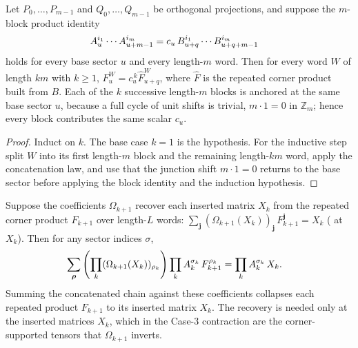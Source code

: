 \begin{lemma}
    \label{lem:periodic_corner_product_blockmatch_pow}
    \leanok
    Let $P_0,\ldots,P_{m-1}$ and $Q_0,\ldots,Q_{m-1}$ be orthogonal projections,
    and suppose the $m$-block product identity
    \begin{align}
        A_u^{i_1}\cdots A_{u+m-1}^{i_m}
         & =
        c_u\, B_{u+q}^{i_1}\cdots B_{u+q+m-1}^{i_m}
        \notag
    \end{align}
    holds for every base sector $u$ and every length-$m$ word. Then for every
    word $W$ of length $km$ with $k\ge1$,
    $F_u^{W}=c_u^{\,k} \widehat F_{u+q}^{W}$, where $\widehat F$ is the
    repeated corner product built from $B$. Each of the $k$ successive
    length-$m$ blocks is anchored at the same base sector $u$, because a full
    cycle of unit shifts is trivial, $m\cdot 1=0$ in $\mathbb Z_m$; hence every
    block contributes the same scalar $c_u$.
\end{lemma}

\begin{proof}\leanok
    Induct on $k$. The base case $k=1$ is the hypothesis. For the inductive
    step split $W$ into its first length-$m$ block and the remaining length-$km$
    word, apply the concatenation law, and use that the junction shift
    $m\cdot 1=0$ returns to the base sector before applying the block identity
    and the induction hypothesis.
\end{proof}

\begin{lemma}
    \label{lem:periodic_corner_contraction}
    \leanok
    Suppose the coefficients $\Omega_{k+1}$ recover each inserted matrix $X_k$
    from the repeated corner product $F_{k+1}$ over length-$L$ words:
    $\sum_{\mathbf j}(\Omega_{k+1}(X_k))_{\mathbf j}\,F_{k+1}^{\mathbf j}=X_k$
    (\cite[eq.~Omegauprop]{DeLasCuevas2017Irreducible} at $X_k$). Then for any
    sector indices $\sigma$,
    \begin{align}
        \sum_{\boldsymbol\rho}
        \left(\prod_k (\Omega_{k+1}(X_k))_{\rho_k}\right)
        \prod_k A_k^{\sigma_k}\,F_{k+1}^{\rho_k}
         & =
        \prod_k A_k^{\sigma_k}\,X_k.
        \notag
    \end{align}
    Summing the concatenated chain against these coefficients collapses each
    repeated product $F_{k+1}$ to its inserted matrix $X_k$. The recovery is
    needed only at the inserted matrices $X_k$, which in the Case-3 contraction
    are the corner-supported tensors that $\Omega_{k+1}$ inverts.
\end{lemma}

